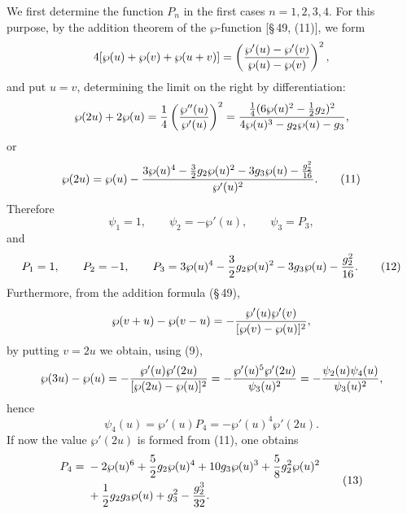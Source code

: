 \documentclass[11pt]{article}
\begin{document}
We first determine the function $P_n$ in the first cases $n=1,2,3,4$. For this purpose, by
the addition theorem of the $\wp$-function [\S\,49, (11)], we form
\[
4[\wp(u)+\wp(v)+\wp(u+v)]
=\left({\wp'(u)-\wp'(v)\over \wp(u)-\wp(v)}\right)^2,
\]
and put $u=v$, determining the limit on the right by differentiation:
\[
\wp(2u)+2\wp(u)
={1\over4}\left({\wp''(u)\over\wp'(u)}\right)^2
={\frac14(6\wp(u)^2-\frac12g_2)^2\over 4\wp(u)^3-g_2\wp(u)-g_3},
\]
or
\begin{equation}
\wp(2u)=\wp(u)-
{3\wp(u)^4-\frac32 g_2\wp(u)^2-3g_3\wp(u)-\frac{g_2^2}{16}
\over \wp'(u)^2}.
\tag{11}
\end{equation}
Therefore
\[
\psi_1=1,\qquad \psi_2=-\wp'(u),\qquad \psi_3=P_3,
\]
and
\begin{equation}
P_1=1,\qquad P_2=-1,\qquad
P_3=3\wp(u)^4-\frac32g_2\wp(u)^2-3g_3\wp(u)-{g_2^2\over16}.
\tag{12}
\end{equation}
Furthermore, from the addition formula (\S\,49),
\[
\wp(v+u)-\wp(v-u)=-{\wp'(u)\wp'(v)\over[\wp(v)-\wp(u)]^2},
\]
by putting $v=2u$ we obtain, using (9),
\[
\wp(3u)-\wp(u)
=-{\wp'(u)\wp'(2u)\over[\wp(2u)-\wp(u)]^2}
=-{\wp'(u)^5\wp'(2u)\over\psi_3(u)^2}
=-{\psi_2(u)\psi_4(u)\over\psi_3(u)^2},
\]
hence
\[
\psi_4(u)=\wp'(u)P_4=-\wp'(u)^4\wp'(2u).
\]
If now the value $\wp'(2u)$ is formed from (11), one obtains
\begin{equation}
\begin{aligned}
P_4={}&-2\wp(u)^6+{5\over2}g_2\wp(u)^4+10g_3\wp(u)^3
+{5\over8}g_2^2\wp(u)^2\\
&+{1\over2}g_2g_3\wp(u)+g_3^2-{g_2^3\over32}.
\end{aligned}
\tag{13}
\end{equation}
\end{document}
